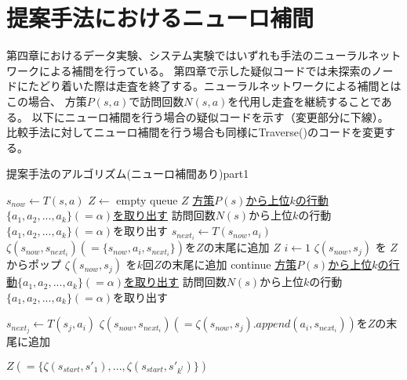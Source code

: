 \section{提案手法におけるニューロ補間}
第四章におけるデータ実験、システム実験ではいずれも手法のニューラルネットワークによる補間を行っている。
第四章で示した疑似コードでは未探索のノードにたどり着いた際は走査を終了する。ニューラルネットワークによる補間とはこの場合、
方策$P(s, a)$で訪問回数$N(s, a)$を代用し走査を継続することである。
以下にニューロ補間を行う場合の疑似コードを示す（変更部分に下線）。
比較手法に対してニューロ補間を行う場合も同様にTraverse()のコードを変更する。
\begin{algorithm}
    \caption{提案手法のアルゴリズム(ニューロ補間あり)part1}
    \small
    \begin{algorithmic}[1]       
           \State $s_{now} \gets T(s, a)$
           \State $Z \gets $ empty queue
             \Return  $Z$
            \EndIf
             \State \underline{方策$P(s)$から上位$k$の行動$\{a_1, a_2, ..., a_{k}\}(=\alpha)$を取り出す}
            \Else
             \State 訪問回数$N(s)$から上位$k$の行動$\{a_1, a_2, ..., a_{k}\}(=\alpha)$を取り出す
            \EndIf
             \State $s_{{next}_i} \gets T(s_{now}, a_i)$
             \State $\zeta(s_{now},s_{{next}_i})(=\{s_{now}, a_i, s_{{next}_i}\})$を$Z$の末尾に追加
           \EndFor
             \Return $Z$
           \EndIf
           \State $i \gets 1$
                    \State $\zeta(s_{now}, s_{j})$ を $Z$からポップ
                        \State $\zeta(s_{now}, s_{j})$ を$k$回$Z$の末尾に追加
                        \State continue
                    \EndIf
                       \State \underline{方策$P(s)$から上位$k$の行動$\{a_1, a_2, ..., a_{k}\}(=\alpha)$を取り出す}
                   \Else
                    \State 訪問回数$N(s)$から上位$k$の行動$\{a_1, a_2, ..., a_{k}\}(=\alpha)$を取り出す
                   \EndIf
                    
                        \State $s_{{next}_j} \gets T(s_{j}, a_i)$
                        \State $\zeta(s_{now},s_{{next}_i})(=\zeta(s_{now}, s_{j}).append({a_i, s_{{next}_i}}))$を$Z$の末尾に追加
                    \EndFor
                    
                \EndFor     
           \EndWhile
           \Return $Z(=\{\zeta(s_{start}, {s'}_1), ..., \zeta(s_{start}, {s'}_{k^l})\})$
        \EndFunction
    \end{algorithmic}
\end{algorithm}
